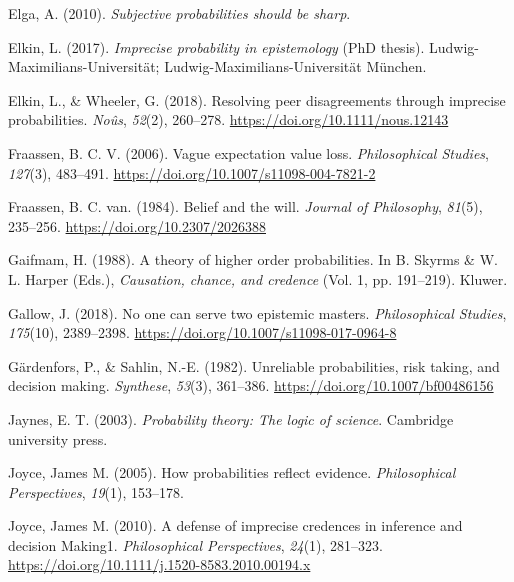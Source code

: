 \documentclass[
  10pt,
  dvipsnames,enabledeprecatedfontcommands]{scrartcl}
\newlength{\cslhangindent}
\newlength{\cslentryspacingunit} %
\newenvironment{CSLReferences}[2] %
 {%
  \setlength{\parindent}{0pt}
  \ifodd #1
  \let\oldpar\par
  \def\par{\hangindent=\cslhangindent\oldpar}
  \fi
  \setlength{\parskip}{#2\cslentryspacingunit}
 }%
 {}
\begin{document}
\begin{CSLReferences}{1}{0}
\leavevmode{}%
Elga, A. (2010). \emph{Subjective probabilities should be sharp}.

\leavevmode{}%
Elkin, L. (2017). \emph{Imprecise probability in epistemology} (PhD
thesis). Ludwig-Maximilians-Universit{ä}t;
Ludwig-Maximilians-Universität München.

\leavevmode{}%
Elkin, L., \& Wheeler, G. (2018). Resolving peer disagreements through
imprecise probabilities. \emph{Noûs}, \emph{52}(2), 260--278.
\url{https://doi.org/10.1111/nous.12143}

\leavevmode{}%
Fraassen, B. C. V. (2006). Vague expectation value loss.
\emph{Philosophical Studies}, \emph{127}(3), 483--491.
\url{https://doi.org/10.1007/s11098-004-7821-2}

\leavevmode{}%
Fraassen, B. C. van. (1984). Belief and the will. \emph{Journal of
Philosophy}, \emph{81}(5), 235--256.
\url{https://doi.org/10.2307/2026388}

\leavevmode{}%
Gaifmam, H. (1988). A theory of higher order probabilities. In B. Skyrms
\& W. L. Harper (Eds.), \emph{Causation, chance, and credence} (Vol. 1,
pp. 191--219). Kluwer.

\leavevmode{}%
Gallow, J. (2018). No one can serve two epistemic masters.
\emph{Philosophical Studies}, \emph{175}(10), 2389--2398.
\url{https://doi.org/10.1007/s11098-017-0964-8}

\leavevmode{}%
Gärdenfors, P., \& Sahlin, N.-E. (1982). Unreliable probabilities, risk
taking, and decision making. \emph{Synthese}, \emph{53}(3), 361--386.
\url{https://doi.org/10.1007/bf00486156}

\leavevmode{}%
Jaynes, E. T. (2003). \emph{Probability theory: The logic of science}.
Cambridge university press.

\leavevmode{}%
Joyce, James M. (2005). How probabilities reflect evidence.
\emph{Philosophical Perspectives}, \emph{19}(1), 153--178.

\leavevmode{}%
Joyce, James M. (2010). A defense of imprecise credences in inference
and decision Making1. \emph{Philosophical Perspectives}, \emph{24}(1),
281--323. \url{https://doi.org/10.1111/j.1520-8583.2010.00194.x}


\end{CSLReferences}
\end{document}
